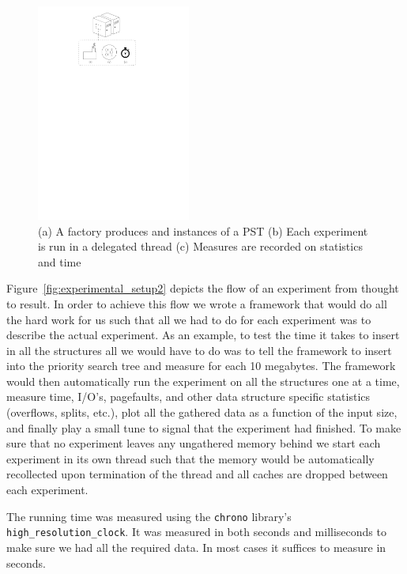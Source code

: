 \documentclass[twoside,11pt,openright]{report}
\begin{document}
\begin{figure}
\captionsetup{width=0.45\textwidth}
	\centering
		\includegraphics[width=0.45\textwidth]{../figures/experimental_setup_4}
	\caption{(a) A factory produces and instances of a PST (b) Each experiment is run in a delegated thread (c) Measures are recorded on statistics and time}
	\label{fig:missing}
\end{figure}

Figure~\ref{fig:experimental_setup2} depicts the flow of an experiment from thought to result. In order to achieve this flow we wrote a framework that would do all the hard work for us such that all we had to do for each experiment was to describe the actual experiment. As an example, to test the time it takes to insert in all the structures all we would have to do was to tell the framework to insert into the priority search tree and measure for each 10 megabytes. The framework would then automatically run the experiment on all the structures one at a time, measure time, I/O's, pagefaults, and other data structure specific statistics (overflows, splits, etc.), plot all the gathered data as a function of the input size, and finally play a small tune to signal that the experiment had finished. To make sure that no experiment leaves any ungathered memory behind we start each experiment in its own thread such that the memory would be automatically recollected upon termination of the thread and all caches are dropped between each experiment.

The running time was measured using the \texttt{chrono} library's \texttt{high\_resolution\_clock}. It was measured in both seconds and milliseconds to make sure we had all the required data. In most cases it suffices to measure in seconds.
\end{document}
